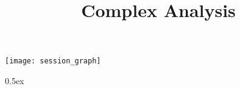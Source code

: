 \documentclass[11pt,a4paper]{article}
\begin{document}
\title{Complex Analysis}
\maketitle

\tableofcontents

\begin{center}
  \texttt{[image: session\_graph]}
\end{center}

\newpage

\renewcommand{\setisabellecontext}[1]{\markright{\href{#1.html}{#1.thy}}}

\parindent 0pt\parskip 0.5ex


\pagestyle{headings}


\nocite{dummy}
\end{document}
